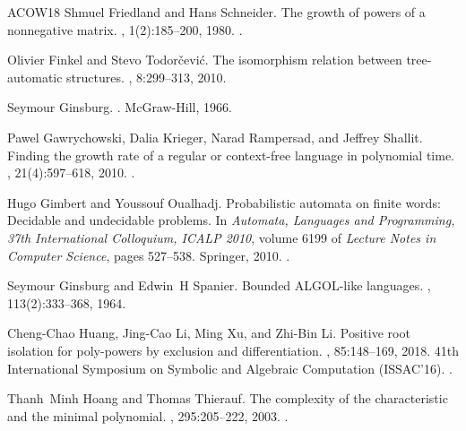 \documentclass[10pt,a4paper]{amsart}
\numberwithin{equation}{section}
\theoremstyle{plain}
\theoremstyle{definition}
\theoremstyle{remark}
\begin{document}
\begin{thebibliography}{ACOW18}
Shmuel Friedland and Hans Schneider.
\newblock The growth of powers of a nonnegative matrix.
, 1(2):185--200, 1980.
\newblock \href {https://doi.org/10.1137/0601022} {}.

Olivier Finkel and Stevo Todor\v{c}evi\'{c}.
\newblock The isomorphism relation between tree-automatic structures.
, 8:299--313, 2010.

Seymour Ginsburg.
.
\newblock McGraw-Hill, 1966.

Pawel Gawrychowski, Dalia Krieger, Narad Rampersad, and Jeffrey Shallit.
\newblock Finding the growth rate of a regular or context-free language in
  polynomial time.
, 21(4):597--618, 2010.
\newblock \href {https://doi.org/10.1142/S0129054110007441}
  {}.

Hugo Gimbert and Youssouf Oualhadj.
\newblock Probabilistic automata on finite words: Decidable and undecidable
  problems.
\newblock In {\em Automata, Languages and Programming, 37th International
  Colloquium, {ICALP} 2010}, volume 6199 of {\em Lecture Notes in Computer
  Science}, pages 527--538. Springer, 2010.
\newblock \href {https://doi.org/10.1007/978-3-642-14162-1_44}
  {}.

Seymour Ginsburg and Edwin~H Spanier.
\newblock Bounded {ALGOL}-like languages.
,
  113(2):333--368, 1964.

Cheng-Chao Huang, Jing-Cao Li, Ming Xu, and Zhi-Bin Li.
\newblock Positive root isolation for poly-powers by exclusion and
  differentiation.
, 85:148--169, 2018.
\newblock 41th International Symposium on Symbolic and Algebraic Computation
  (ISSAC'16).
\newblock \href {https://doi.org/10.1016/j.jsc.2017.07.007}
  {}.

Thanh~Minh Hoang and Thomas Thierauf.
\newblock The complexity of the characteristic and the minimal polynomial.
, 295:205--222, 2003.
\newblock \href {https://doi.org/10.1016/S0304-3975(02)00404-8}
  {}.


\end{thebibliography}
\end{document}
